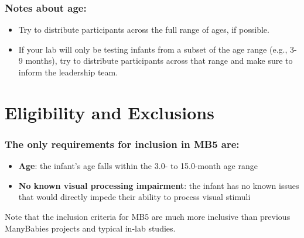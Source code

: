 \documentclass[
  letterpaper,
  DIV=11,
  numbers=noendperiod,
  oneside]{scrreprt}
\providecommand{\tightlist}{%
  \setlength{\itemsep}{0pt}\setlength{\parskip}{0pt}}
\begin{document}
\subsubsection{Notes about age:}\label{notes-about-age}

\begin{itemize}
\tightlist
\item
  Try to distribute participants across the full range of ages, if
  possible.
\item
  If your lab will only be testing infants from a subset of the age
  range (e.g., 3-9 months), try to distribute participants across that
  range and make sure to inform the leadership team.
\end{itemize}

\section{Eligibility and Exclusions}\label{eligibility-and-exclusions}

\subsubsection{\texorpdfstring{The \textbf{only} requirements for
inclusion in MB5
are:}{The only requirements for inclusion in MB5 are:}}\label{the-only-requirements-for-inclusion-in-mb5-are}

\begin{itemize}
\tightlist
\item
  \textbf{Age}: the infant's age falls within the 3.0- to 15.0-month age
  range
\item
  \textbf{No known visual processing impairment}: the infant has no
  known issues that would directly impede their ability to process
  visual stimuli
\end{itemize}

\begin{tcolorbox}[enhanced jigsaw, coltitle=black, colframe=quarto-callout-tip-color-frame, titlerule=0mm, colback=white, arc=.35mm, toprule=.15mm, left=2mm, colbacktitle=quarto-callout-tip-color!10!white, opacityback=0, bottomtitle=1mm, title=\textcolor{quarto-callout-tip-color}{\faLightbulb}\hspace{0.5em}{\textbf{Infants with other characteristics that are commonly used as
exclusion criteria in developmental studies (e.g., hearing impairment,
premature birth, bilingual, etc.) can be included in the sample.}}, breakable, rightrule=.15mm, opacitybacktitle=0.6, toptitle=1mm, leftrule=.75mm, bottomrule=.15mm]

Note that the inclusion criteria for MB5 are much more inclusive than
previous ManyBabies projects and typical in-lab studies.

\end{tcolorbox}
\end{document}
